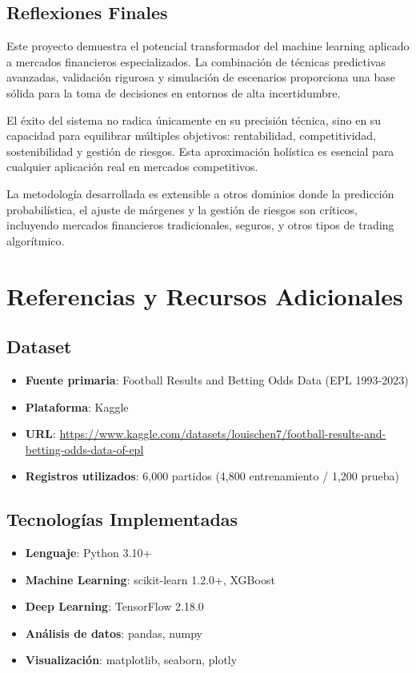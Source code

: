 \documentclass{article}
\begin{document}
\subsection{Reflexiones Finales}

Este proyecto demuestra el potencial transformador del machine learning aplicado a mercados financieros especializados. La combinación de técnicas predictivas avanzadas, validación rigurosa y simulación de escenarios proporciona una base sólida para la toma de decisiones en entornos de alta incertidumbre.

El éxito del sistema no radica únicamente en su precisión técnica, sino en su capacidad para equilibrar múltiples objetivos: rentabilidad, competitividad, sostenibilidad y gestión de riesgos. Esta aproximación holística es esencial para cualquier aplicación real en mercados competitivos.

La metodología desarrollada es extensible a otros dominios donde la predicción probabilística, el ajuste de márgenes y la gestión de riesgos son críticos, incluyendo mercados financieros tradicionales, seguros, y otros tipos de trading algorítmico.

\section{Referencias y Recursos Adicionales}

\subsection{Dataset}
\begin{itemize}
    \item \textbf{Fuente primaria}: Football Results and Betting Odds Data (EPL 1993-2023)
    \item \textbf{Plataforma}: Kaggle
    \item \textbf{URL}: \url{https://www.kaggle.com/datasets/louischen7/football-results-and-betting-odds-data-of-epl}
    \item \textbf{Registros utilizados}: 6,000 partidos (4,800 entrenamiento / 1,200 prueba)
\end{itemize}

\subsection{Tecnologías Implementadas}
\begin{itemize}
    \item \textbf{Lenguaje}: Python 3.10+
    \item \textbf{Machine Learning}: scikit-learn 1.2.0+, XGBoost
    \item \textbf{Deep Learning}: TensorFlow 2.18.0
    \item \textbf{Análisis de datos}: pandas, numpy
    \item \textbf{Visualización}: matplotlib, seaborn, plotly
\end{itemize}
\end{document}
